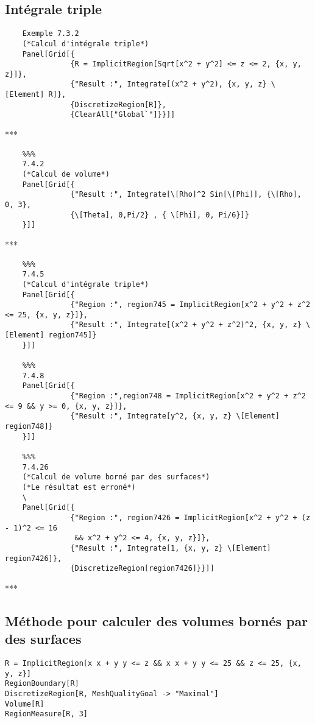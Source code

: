 \subsection{Intégrale triple}
	\begin{verbatim}
	Exemple 7.3.2
	(*Calcul d'intégrale triple*)
	Panel[Grid[{
	           {R = ImplicitRegion[Sqrt[x^2 + y^2] <= z <= 2, {x, y, z}]},
	           {"Result :", Integrate[(x^2 + y^2), {x, y, z} \[Element] R]},
	           {DiscretizeRegion[R]},
	           {ClearAll["Global`"]}}]]
	\end{verbatim}
	\begin{center}***\end{center}
	\begin{verbatim}
	%%%
	7.4.2
	(*Calcul de volume*)
	Panel[Grid[{
	           {"Result :", Integrate[\[Rho]^2 Sin[\[Phi]], {\[Rho], 0, 3},
	           {\[Theta], 0,Pi/2} , { \[Phi], 0, Pi/6}]}
	}]]
	\end{verbatim}
	\begin{center}***\end{center}
	\begin{verbatim}
	%%%
	7.4.5
	(*Calcul d'intégrale triple*)
	Panel[Grid[{
	           {"Region :", region745 = ImplicitRegion[x^2 + y^2 + z^2 <= 25, {x, y, z}]},
	           {"Result :", Integrate[(x^2 + y^2 + z^2)^2, {x, y, z} \[Element] region745]}
	}]]
	
	%%%
	7.4.8
	Panel[Grid[{
	           {"Region :",region748 = ImplicitRegion[x^2 + y^2 + z^2 <= 9 && y >= 0, {x, y, z}]},
	           {"Result :", Integrate[y^2, {x, y, z} \[Element] region748]}
	}]]
	
	%%%
	7.4.26
	(*Calcul de volume borné par des surfaces*)
	(*Le résultat est erroné*)
	\
	Panel[Grid[{
	           {"Region :", region7426 = ImplicitRegion[x^2 + y^2 + (z - 1)^2 <= 16
	            && x^2 + y^2 <= 4, {x, y, z}]},
	           {"Result :", Integrate[1, {x, y, z} \[Element] region7426]},
	           {DiscretizeRegion[region7426]}}]]
	\end{verbatim}
	\begin{center}***\end{center}	
\subsection{Méthode pour calculer des volumes bornés par des surfaces}
		\begin{flushleft}
			\verb|R = ImplicitRegion[x x + y y <= z && x x + y y <= 25 && z <= 25, {x, y, z}]|\\
			\verb|RegionBoundary[R]|\\
			\verb|DiscretizeRegion[R, MeshQualityGoal -> "Maximal"]|\\
			\verb|Volume[R]|\\
			\verb|RegionMeasure[R, 3]|
		\end{flushleft}	